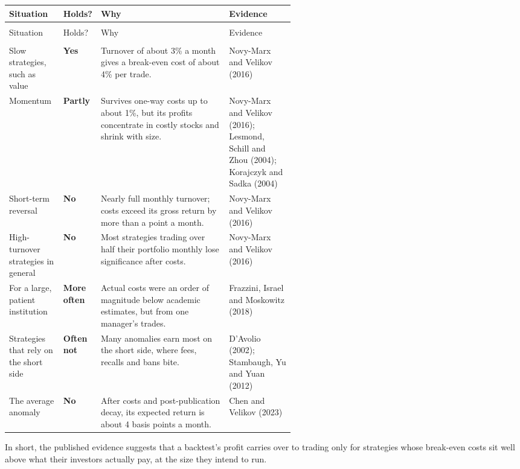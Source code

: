 {\small
\begin{longtable}{@{}>{\raggedright\arraybackslash}p{0.19\linewidth}>{\raggedright\arraybackslash}p{0.13\linewidth}>{\raggedright\arraybackslash}p{}>{\raggedright\arraybackslash}p{0.23\linewidth}@{}}
\toprule
Situation & Holds? & Why & Evidence \\
\midrule
\endfirsthead
\multicolumn{4}{@{}l}{\emph{(continued)}} \\
\toprule
Situation & Holds? & Why & Evidence \\
\midrule
\endhead
\midrule
\multicolumn{4}{r@{}}{\emph{(continued on the next page)}} \\
\endfoot
\bottomrule
\endlastfoot
Slow strategies, such as value & \textbf{Yes} & Turnover of about 3\% a month gives a break-even cost of about 4\% per trade. & Novy-Marx and Velikov (2016) \\*
\addlinespace[3pt]
Momentum & \textbf{Partly} & Survives one-way costs up to about 1\%, but its profits concentrate in costly stocks and shrink with size. & Novy-Marx and Velikov (2016); Lesmond, Schill and Zhou (2004); Korajczyk and Sadka (2004) \\
\addlinespace[3pt]
Short-term reversal & \textbf{No} & Nearly full monthly turnover; costs exceed its gross return by more than a point a month. & Novy-Marx and Velikov (2016) \\
\addlinespace[3pt]
High-turnover strategies in general & \textbf{No} & Most strategies trading over half their portfolio monthly lose significance after costs. & Novy-Marx and Velikov (2016) \\
\addlinespace[3pt]
For a large, patient institution & \textbf{More often} & Actual costs were an order of magnitude below academic estimates, but from one manager's trades. & Frazzini, Israel and Moskowitz (2018) \\
\addlinespace[3pt]
Strategies that rely on the short side & \textbf{Often not} & Many anomalies earn most on the short side, where fees, recalls and bans bite. & D'Avolio (2002); Stambaugh, Yu and Yuan (2012) \\*
\addlinespace[3pt]
The average anomaly & \textbf{No} & After costs and post-publication decay, its expected return is about 4 basis points a month. & Chen and Velikov (2023) \\
\end{longtable}
\addtocounter{table}{-1}%
}

In short, the published evidence suggests that a backtest's profit carries over to trading only for strategies whose break-even costs sit well above what their investors actually pay, at the size they intend to run.

